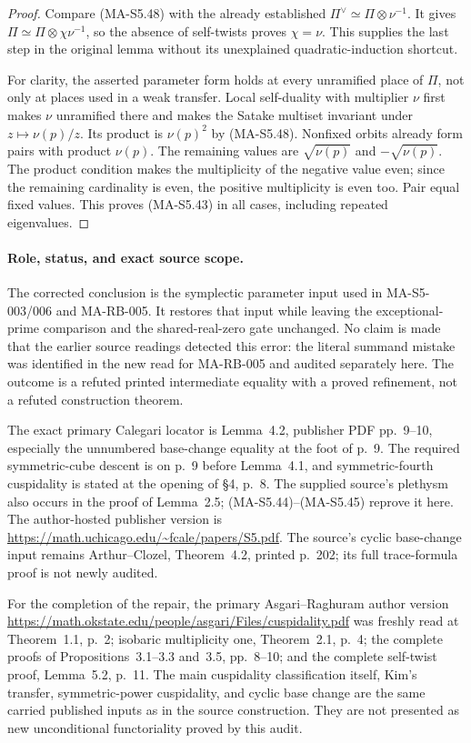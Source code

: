 \begin{proof}
Compare (MA-S5.48) with the already established
$\Pi^\vee\simeq\Pi\otimes\nu^{-1}$.
It gives $\Pi\simeq\Pi\otimes\chi\nu^{-1}$, so
the absence of self-twists proves $\chi=\nu$.
This supplies the last step in the original lemma
without its unexplained quadratic-induction shortcut.

For clarity, the asserted parameter form holds at every
unramified place of $\Pi$, not only at places used in a
weak transfer.  Local self-duality with multiplier $\nu$
first makes $\nu$ unramified there and makes the Satake
multiset invariant under $z\mapsto\nu(p)/z$.
Its product is $\nu(p)^2$ by (MA-S5.48).
Nonfixed orbits already form pairs with product $\nu(p)$.
The remaining values are $\sqrt{\nu(p)}$ and
$-\sqrt{\nu(p)}$.  The product condition makes the
multiplicity of the negative value even; since the
remaining cardinality is even, the positive multiplicity
is even too.  Pair equal fixed values.  This proves
(MA-S5.43) in all cases, including repeated eigenvalues.
\end{proof}

\paragraph{Role, status, and exact source scope.}
The corrected conclusion is the symplectic parameter input
used in MA-S5-003/006 and MA-RB-005.  It restores that
input while leaving the exceptional-prime comparison and
the shared-real-zero gate unchanged.  No claim is made
that the earlier source readings detected this error:
the literal summand mistake was identified in the new
read for MA-RB-005 and audited separately here.
The outcome is a refuted printed intermediate equality
with a proved refinement, not a refuted construction theorem.

The exact primary Calegari locator is Lemma~4.2, publisher
PDF pp.~9--10, especially the unnumbered base-change
equality at the foot of p.~9.  The required symmetric-cube
descent is on p.~9 before Lemma~4.1, and symmetric-fourth
cuspidality is stated at the opening of \S4, p.~8.
The supplied source's plethysm also occurs in the proof
of Lemma~2.5; (MA-S5.44)--(MA-S5.45) reprove it here.
The author-hosted publisher version is
\url{https://math.uchicago.edu/~fcale/papers/S5.pdf}.
The source's cyclic base-change input remains
Arthur--Clozel, Theorem~4.2, printed p.~202;
its full trace-formula proof is not newly audited.

For the completion of the repair, the primary
Asgari--Raghuram author version
\url{https://math.okstate.edu/people/asgari/Files/cuspidality.pdf}
was freshly read at Theorem~1.1, p.~2; isobaric
multiplicity one, Theorem~2.1, p.~4; the complete proofs
of Propositions~3.1--3.3 and~3.5, pp.~8--10; and the
complete self-twist proof, Lemma~5.2, p.~11.
The main cuspidality classification itself, Kim's
transfer, symmetric-power cuspidality, and cyclic base
change are the same carried published inputs as in the
source construction.  They are not presented as new
unconditional functoriality proved by this audit.

